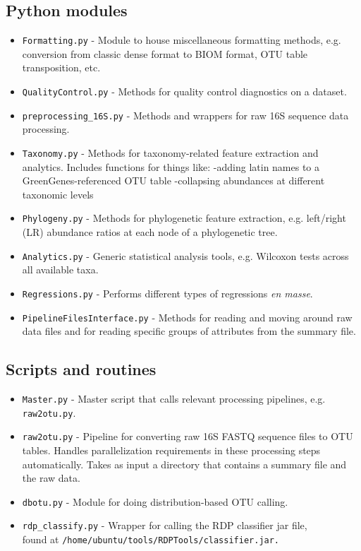 \documentclass[11pt, oneside]{article}   	%
\begin{document}
\subsection{Python modules}
\begin{itemize}
  \item {\tt Formatting.py} - Module to house miscellaneous formatting methods, e.g. conversion from classic dense format to BIOM format, OTU table transposition, etc.
	\item {\tt QualityControl.py} - Methods for quality control diagnostics on a dataset.
	\item {\tt preprocessing\_16S.py} - Methods and wrappers for raw 16S sequence data processing.
	\item {\tt Taxonomy.py} - Methods for taxonomy-related feature extraction and analytics.  Includes functions for things like:
		-adding latin names to a GreenGenes-referenced OTU table
		-collapsing abundances at different taxonomic levels
	\item {\tt Phylogeny.py} - Methods for phylogenetic feature extraction, e.g. left/right (LR) abundance ratios at each node of a phylogenetic tree.
	\item {\tt Analytics.py} - Generic statistical analysis tools, e.g. Wilcoxon tests across all available taxa.
	\item {\tt Regressions.py} - Performs different types of regressions \textit{en masse}.
	\item {\tt PipelineFilesInterface.py} - Methods for reading and moving around raw data files 
	and for reading specific groups of attributes from the summary file.
\end{itemize}

\subsection{Scripts and routines}
\begin{itemize}
	\item {\tt Master.py} - Master script that calls relevant processing pipelines, e.g. {\tt raw2otu.py}.
	\item {\tt raw2otu.py} - Pipeline for converting raw 16S FASTQ sequence files to OTU tables.  Handles parallelization requirements in these processing steps automatically.  Takes as input a directory that contains a summary file and the raw data.
	\item{ \tt dbotu.py} - Module for doing distribution-based OTU calling.
	\item {\tt rdp\_classify.py} - Wrapper for calling the RDP classifier jar file, \\
	found at \tt /home/ubuntu/tools/RDPTools/classifier.jar.
\end{itemize}
\end{document}
